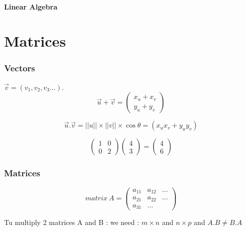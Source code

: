 \documentclass{article}
\begin{document}
    \subsection{Linear Algebra}

    \part{Matrices}

    \section{Vectors}
    $ \overrightarrow{v} = (v_1,v_2,v_3...)$. \\
    \[
        \overrightarrow{u} + \overrightarrow{v} =
        \left(\begin{array}{c}
            x_u + x_v \\
            y_u + y_v
        \end{array}
        \right)
    \]

    \[
        \overrightarrow{u} . \overrightarrow{v} = ||u||\times ||v|| \times \cos \theta = (x_ux_v + y_uy_v)
    \]

    \[
    \left(\begin{array}{cc}
        1 & 0 \\
        0 & 2
    \end{array} \right)
    \left(\begin{array}{c}
    4 \\
    3
    \end{array} \right)
    =
    \left(\begin{array}{c}
    4 \\
    6
    \end{array}\right)
    \]

    \section{Matrices}

    \[ matrix~A =
    \left(\begin{array}{ccc}
        a_{11} & a_{12} & ... \\
        a_{21} & a_{22} & ...\\
        a_{31} & ...
    \end{array} \right)
    \]

    Tu multiply 2 matrices A and B : we need : $m \times n$ and $n\times p$ and $A.B \not= B.A$\\
\end{document}
